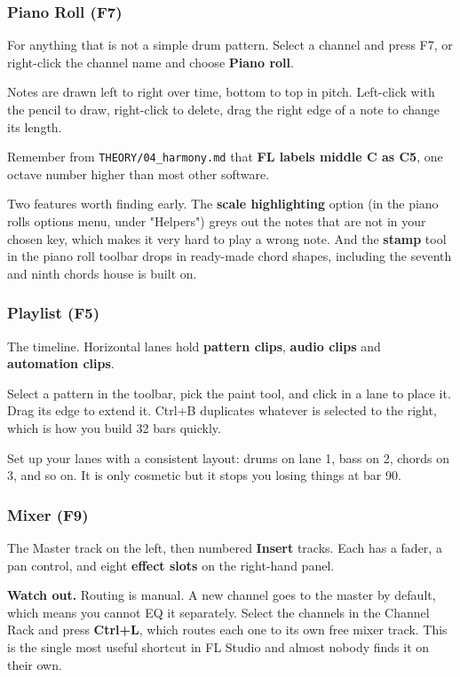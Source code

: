 \subsubsection{Piano Roll (F7)}\label{fl01_interface-piano-roll-f7}

For anything that is not a simple drum pattern. Select a channel and press F7, or right-click
the channel name and choose \textbf{Piano roll}.

Notes are drawn left to right over time, bottom to top in pitch. Left-click with the pencil
to draw, right-click to delete, drag the right edge of a note to change its length.

Remember from \texttt{THEORY/04\_harmony.md} that \textbf{FL labels middle C as C5}, one octave number
higher than most other software.

Two features worth finding early. The \textbf{scale highlighting} option (in the piano roll\textquotesingle s
options menu, under "Helpers") greys out the notes that are not in your chosen key, which
makes it very hard to play a wrong note. And the \textbf{stamp} tool in the piano roll toolbar
drops in ready-made chord shapes, including the seventh and ninth chords house is built on.

\subsubsection{Playlist (F5)}\label{fl01_interface-playlist-f5}

The timeline. Horizontal lanes hold \textbf{pattern clips}, \textbf{audio clips} and \textbf{automation
clips}.

Select a pattern in the toolbar, pick the paint tool, and click in a lane to place it. Drag
its edge to extend it. Ctrl+B duplicates whatever is selected to the right, which is how you
build 32 bars quickly.

Set up your lanes with a consistent layout: drums on lane 1, bass on 2, chords on 3, and so
on. It is only cosmetic but it stops you losing things at bar 90.

\subsubsection{Mixer (F9)}\label{fl01_interface-mixer-f9}

The Master track on the left, then numbered \textbf{Insert} tracks. Each has a fader, a
pan control, and eight \textbf{effect slots} on the right-hand panel.

\begin{pitfallbox}
\textbf{Watch out.} Routing is manual. A new channel goes to the master by default, which means
you cannot EQ it separately. Select the channels in the Channel Rack and press \textbf{Ctrl+L},
which routes each one to its own free mixer track. This is the single most useful shortcut
in FL Studio and almost nobody finds it on their own.
\end{pitfallbox}

